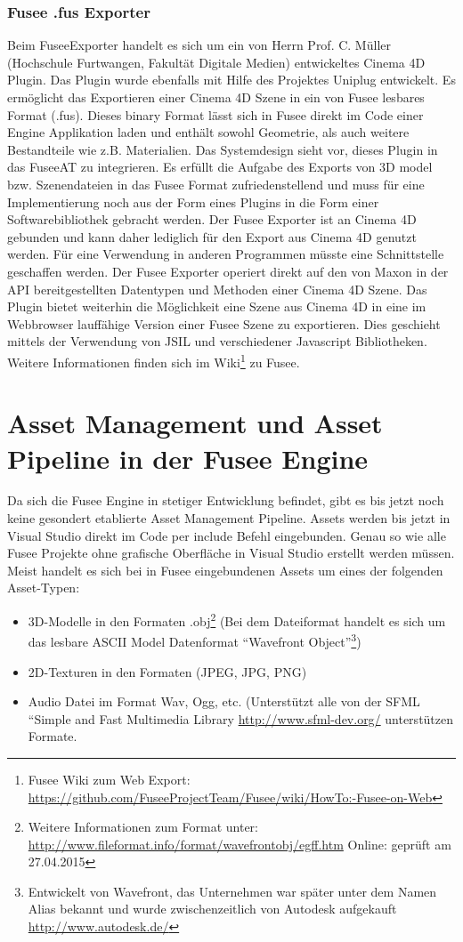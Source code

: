 \documentclass[pagesize, paper=a4, fontsize=12pt, titlepage=true, headings=small, headnosepline, abstractoff, liststotoc, nochapterprefix, plainheadsepline, twoside]{scrreprt}
\begin{document}
\subsubsection{Fusee .fus Exporter}
Beim FuseeExporter handelt es sich um ein von Herrn Prof. C. Müller (Hochschule Furtwangen, Fakultät Digitale Medien) entwickeltes Cinema 4D Plugin. Das Plugin wurde ebenfalls mit Hilfe des Projektes Uniplug entwickelt. Es ermöglicht das Exportieren einer Cinema 4D Szene in ein von Fusee lesbares Format (.fus). Dieses binary Format lässt sich in Fusee direkt im Code einer Engine Applikation laden und enthält sowohl Geometrie, als auch weitere Bestandteile wie z.B. Materialien. Das Systemdesign sieht vor, dieses Plugin in das FuseeAT zu integrieren. Es erfüllt die Aufgabe des Exports von 3D model bzw. Szenendateien in das Fusee Format zufriedenstellend und muss für eine Implementierung noch aus der Form eines Plugins in die Form einer Softwarebibliothek gebracht werden. Der Fusee Exporter ist an Cinema 4D gebunden und kann daher lediglich für den Export aus Cinema 4D genutzt werden. Für eine Verwendung in anderen Programmen müsste eine Schnittstelle geschaffen werden. Der Fusee Exporter operiert direkt auf den von Maxon in der API bereitgestellten Datentypen und Methoden einer Cinema 4D Szene.
Das Plugin bietet weiterhin die Möglichkeit eine Szene aus Cinema 4D in eine im Webbrowser lauffähige Version einer Fusee Szene zu exportieren. Dies geschieht mittels der Verwendung von JSIL und verschiedener Javascript Bibliotheken. Weitere Informationen finden sich im Wiki\footnote{Fusee Wiki zum Web Export: \url{https://github.com/FuseeProjectTeam/Fusee/wiki/HowTo:-Fusee-on-Web}} zu Fusee.

\section{Asset Management und Asset Pipeline in der Fusee Engine}
Da sich die Fusee Engine in stetiger Entwicklung befindet, gibt es bis jetzt noch keine gesondert etablierte Asset Management Pipeline. Assets werden bis jetzt in Visual Studio direkt im Code per include Befehl eingebunden. Genau so wie alle Fusee Projekte ohne grafische Oberfläche in Visual Studio erstellt werden müssen. Meist handelt es sich bei in Fusee eingebundenen Assets um eines der folgenden Asset-Typen:
\begin{itemize}
\item 3D-Modelle in den Formaten .obj\footnote{Weitere Informationen zum Format unter: \url{http://www.fileformat.info/format/wavefrontobj/egff.htm} Online: geprüft am 27.04.2015} (Bei dem Dateiformat handelt es sich um das lesbare ASCII Model Datenformat “Wavefront Object”\footnote{Entwickelt von Wavefront, das Unternehmen war später unter dem Namen Alias bekannt und wurde zwischenzeitlich von Autodesk aufgekauft \url{http://www.autodesk.de/}})
\item 2D-Texturen in den Formaten (JPEG, JPG, PNG)
\item Audio Datei im Format Wav, Ogg, etc. (Unterstützt alle von der SFML “Simple and Fast Multimedia Library \url{http://www.sfml-dev.org/} unterstützen Formate.
\end{itemize}
\end{document}
